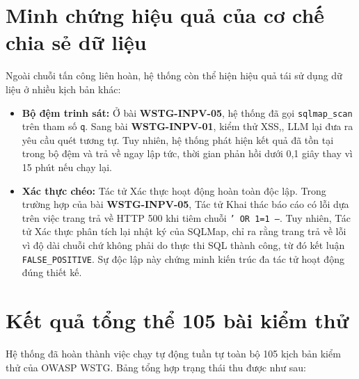 \section{Minh chứng hiệu quả của cơ chế chia sẻ dữ liệu}
Ngoài chuỗi tấn công liên hoàn, hệ thống còn thể hiện hiệu quả tái sử dụng dữ liệu ở nhiều kịch bản khác:
\begin{itemize}
    \item \textbf{Bộ đệm trinh sát:} Ở bài \textbf{WSTG-INPV-05}, hệ thống đã gọi \texttt{sqlmap\_scan} trên tham số \texttt{q}. Sang bài \textbf{WSTG-INPV-01}, kiểm thử XSS,, LLM lại đưa ra yêu cầu quét tương tự. Tuy nhiên, hệ thống phát hiện kết quả đã tồn tại trong bộ đệm và trả về ngay lập tức, thời gian phản hồi dưới 0,1 giây thay vì 15 phút nếu chạy lại.
    \item \textbf{Xác thực chéo:} Tác tử Xác thực hoạt động hoàn toàn độc lập. Trong trường hợp của bài \textbf{WSTG-INPV-05}, Tác tử Khai thác báo cáo có lỗi dựa trên việc trang trả về HTTP 500 khi tiêm chuỗi \texttt{' OR 1=1 --}. Tuy nhiên, Tác tử Xác thực phân tích lại nhật ký của SQLMap, chỉ ra rằng trang trả về lỗi vì độ dài chuỗi chứ không phải do thực thi SQL thành công, từ đó kết luận \texttt{FALSE\_POSITIVE}. Sự độc lập này chứng minh kiến trúc đa tác tử hoạt động đúng thiết kế.
\end{itemize}

\section{Kết quả tổng thể 105 bài kiểm thử}
Hệ thống đã hoàn thành việc chạy tự động tuần tự toàn bộ 105 kịch bản kiểm thử của OWASP WSTG. Bảng tổng hợp trạng thái thu được như sau:

